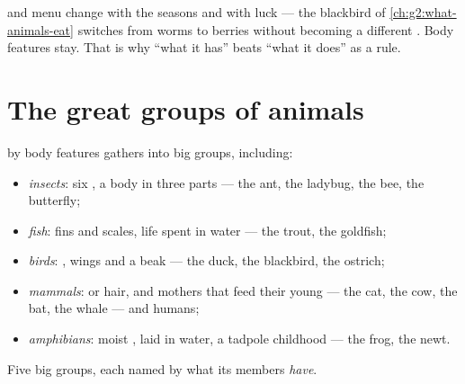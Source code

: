 \begin{remark}\label{rem:g3:sorting-living-things:why}
 and menu change with the seasons and with luck --- the
blackbird of \cref{ch:g2:what-animals-eat} switches from worms to
berries without becoming a different . Body features stay.
That is why ``what it has'' beats ``what it does'' as a 
rule.
\end{remark}

\section{The great groups of animals}

\begin{proposition}\label{prop:g3:sorting-living-things:groups}
 by body features gathers  into big groups,
including:
\begin{itemize}
  \item \emph{insects}: six , a body in three
        parts --- the ant, the ladybug, the bee, the butterfly;
  \item \emph{fish}: fins and scales, life spent in
        water --- the trout, the goldfish;
  \item \emph{birds}: , wings and a beak ---
        the duck, the blackbird, the ostrich;
  \item \emph{mammals}:  or hair, and mothers
        that feed their young  --- the cat, the cow, the bat,
        the whale --- and humans;
  \item \emph{amphibians}: moist ,  laid
        in water, a tadpole childhood --- the frog, the newt.
\end{itemize}
\end{proposition}
\admitted

\begin{omfigure}

{\small Five big groups, each named by what its members
\emph{have}.}
\end{omfigure}

